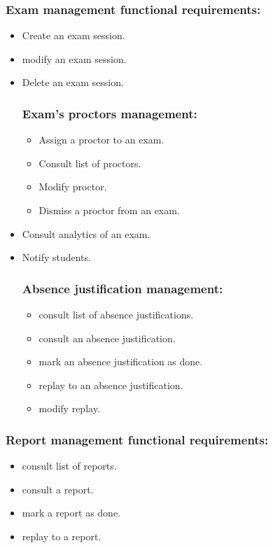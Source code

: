 \documentclass[a4paper,12p]{article}
\begin{document}
     \subsubsection{Exam management functional requirements:}
     \begin{itemize}
        \item Create an exam session.
        \item modify an exam session.
        \item Delete an exam session.
        \subsubsection{Exam's proctors management:}
         \begin{itemize}
            \item Assign a proctor to an exam.
            \item Consult list of proctors.
            \item Modify proctor.
            \item Dismiss a proctor from an exam.
         \end{itemize}
         \item Consult analytics of an exam.
         \item Notify students.
         \subsubsection{Absence justification management:}
         \begin{itemize}
            \item consult list of absence justifications.
            \item consult an absence justification.
            \item mark an absence justification as done.
            \item replay to an absence justification.
            \item modify replay.
         \end{itemize}
     \end{itemize}

     \subsubsection{Report management functional requirements:}
     \begin{itemize}
         \item consult list of reports.
         \item consult a report.
         \item mark a report as done.
         \item replay to a report.
     \end{itemize}
\end{document}
